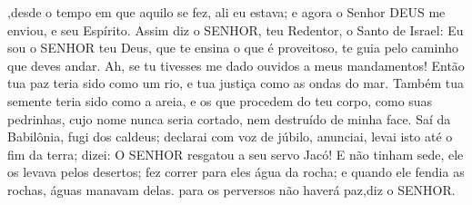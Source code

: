 {{} ,desde o tempo em que aquilo se fez, ali eu estava; e agora o Senhor DEUS me enviou, e seu Espírito.
Assim diz o SENHOR, teu Redentor, o Santo de Israel: Eu sou o SENHOR teu Deus, que te ensina o que é proveitoso,
{} te guia pelo caminho que deves andar.
Ah, se tu tivesses me dado ouvidos a meus mandamentos! Então tua paz teria sido como um rio, e tua justiça como as ondas do mar.
Também tua semente teria sido como a areia, e os que procedem do teu corpo, como suas pedrinhas, cujo nome nunca seria cortado, nem destruído de minha face.
Saí da Babilônia, fugi dos caldeus; declarai com voz de júbilo, anunciai,
{} levai isto até o fim da terra; dizei: O SENHOR resgatou a seu servo Jacó!
E não tinham sede,
{} ele os levava pelos desertos; fez correr para eles água da rocha; e quando ele fendia as rochas, águas manavam delas.
 para os perversos não haverá paz,diz o SENHOR.

}
